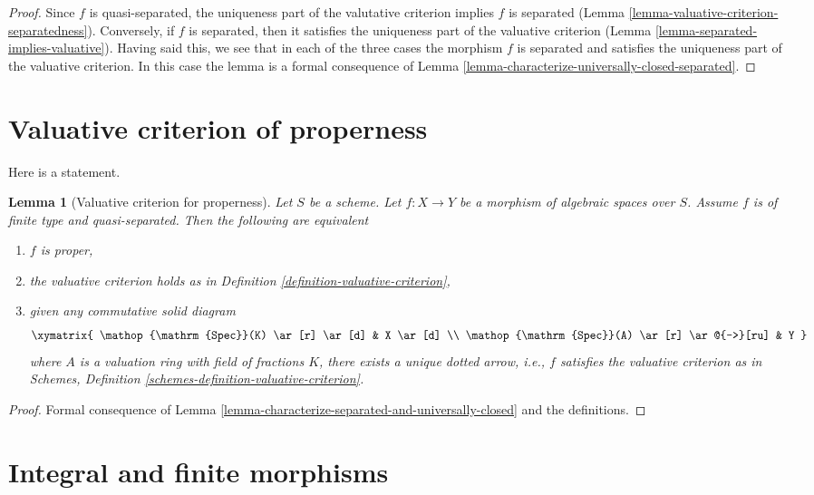 \documentclass{stacks-project}
\theoremstyle{plain}
\newtheorem{lemma}[subsection]{Lemma}
\theoremstyle{definition}
\theoremstyle{remark}
\numberwithin{equation}{subsection}
\def\Spec{\mathop{\mathrm{Spec}}}
\begin{document}
\begin{proof}
Since $f$ is quasi-separated, the uniqueness
part of the valutative criterion implies $f$ is separated
(Lemma \ref{lemma-valuative-criterion-separatedness}).
Conversely, if $f$ is separated, then it satisfies the
uniqueness part of the valuative criterion
(Lemma \ref{lemma-separated-implies-valuative}).
Having said this, we see that in each of the three cases the
morphism $f$ is separated and satisfies the uniqueness part
of the valuative criterion. In this case the lemma is a formal
consequence of
Lemma \ref{lemma-characterize-universally-closed-separated}.
\end{proof}



\section{Valuative criterion of properness}
\label{section-valuative-criterion-properness}

\noindent
Here is a statement.

\begin{lemma}[Valuative criterion for properness]
\label{lemma-characterize-proper}
Let $S$ be a scheme. Let $f : X \to Y$ be a morphism of algebraic spaces
over $S$. Assume $f$ is of finite type and quasi-separated. Then the
following are equivalent
\begin{enumerate}
\item $f$ is proper,
\item the valuative criterion holds as in Definition
\ref{definition-valuative-criterion},
\item given any commutative solid diagram
$$
\xymatrix{
\Spec(K) \ar[r] \ar[d] & X \ar[d] \\
\Spec(A) \ar[r] \ar@{-->}[ru] & Y
}
$$
where $A$ is a valuation ring with field of fractions $K$, there exists
a unique dotted arrow, i.e., $f$ satisfies the valuative
criterion as in
Schemes, Definition \ref{schemes-definition-valuative-criterion}.
\end{enumerate}
\end{lemma}

\begin{proof}
Formal consequence of
Lemma \ref{lemma-characterize-separated-and-universally-closed}
and the definitions.
\end{proof}





\section{Integral and finite morphisms}
\label{section-integral}
\end{document}
